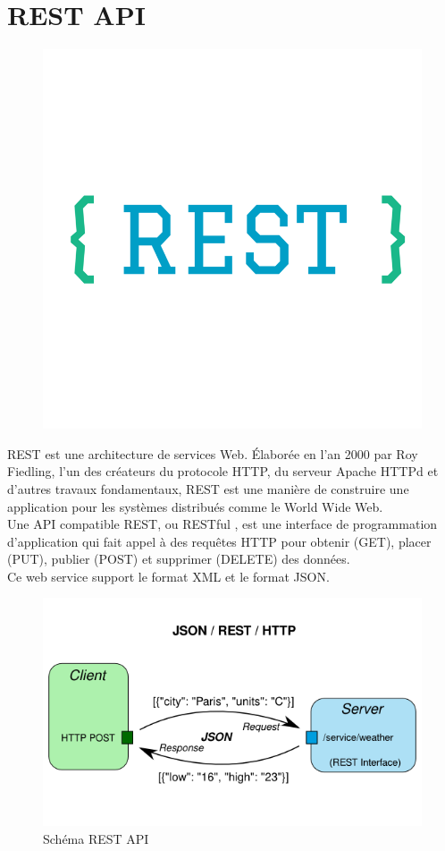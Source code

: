 \documentclass[12pt,a4paper]{report}
\begin{document}
		\section{REST API}
		\begin{figure}
		\includegraphics[scale=0.2]{./graphics/logo_restapi.png}
		\end{figure}
REST est une architecture de services Web. Élaborée en l'an 2000 par Roy Fiedling, l'un des
créateurs du protocole HTTP, du serveur Apache HTTPd et d'autres travaux fondamentaux, REST
est une manière de construire une application pour les systèmes distribués comme le World Wide
Web.\\
Une API compatible REST, ou \guillemotleft RESTful \guillemotright, est une interface de programmation d'application qui fait appel à des requêtes HTTP pour obtenir (GET), placer (PUT), publier (POST) et supprimer (DELETE) des données.\\
Ce web service support le format XML et le format JSON.
		\begin{figure}[!hbtp]
		\centering
		\includegraphics[scale=0.5]{./graphics/restapi.png}
		\caption{Schéma REST API}
		\end{figure}
		
\end{document}
